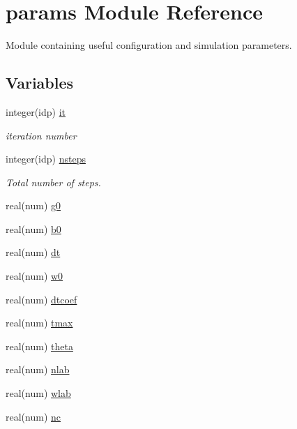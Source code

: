 \hypertarget{namespaceparams}{}\section{params Module Reference}
\label{namespaceparams}


Module containing useful configuration and simulation parameters.  


\subsection*{Variables}
\begin{DoxyCompactItemize}
\item 
integer(idp) \hyperlink{namespaceparams_aa53b49f79463d25c9fe7a51e6b990067}{it}
\begin{DoxyCompactList}\small\item\em iteration number \end{DoxyCompactList}\item 
integer(idp) \hyperlink{namespaceparams_af579aad3e0f1bb760fb94ef0bf1c4b0a}{nsteps}
\begin{DoxyCompactList}\small\item\em Total number of steps. \end{DoxyCompactList}\item 
real(num) \hyperlink{namespaceparams_af27554c70c98a90a2d5fbd7a4083f366}{g0}
\item 
real(num) \hyperlink{namespaceparams_a856909cec83e772b7266d146b4e70d7f}{b0}
\item 
real(num) \hyperlink{namespaceparams_aab5b9003ea4155de1cb7c0a3366e0b73}{dt}
\item 
real(num) \hyperlink{namespaceparams_a5351cde6ada6e860eae678ba5e6453a5}{w0}
\item 
real(num) \hyperlink{namespaceparams_a565cff6b9c99bcab68c1ae3af5f03d9e}{dtcoef}
\item 
real(num) \hyperlink{namespaceparams_afb32b5ca9f2ce80f08c5098d46a45750}{tmax}
\item 
real(num) \hyperlink{namespaceparams_ae4f22fd44655050055d203271b8b4025}{theta}
\item 
real(num) \hyperlink{namespaceparams_a977c294dda0d117791fd0e6f7c9bdad5}{nlab}
\item 
real(num) \hyperlink{namespaceparams_a040901e6fd1ee6a06ba4f9a9829d0427}{wlab}
\item 
real(num) \hyperlink{namespaceparams_adb7d5f7cb5d7431bdf0e5a8ea5b1ad56}{nc}
\item 

\end{DoxyCompactItemize}
